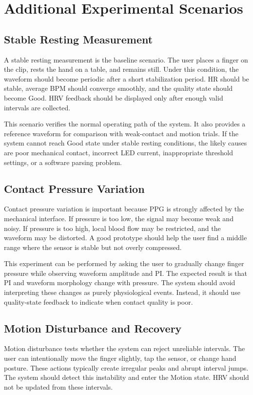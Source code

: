 \documentclass[10pt,conference]{IEEEtran}
\begin{document}
\section{Additional Experimental Scenarios}
\subsection{Stable Resting Measurement}
A stable resting measurement is the baseline scenario. The user places a finger on the clip, rests the hand on a table, and remains still. Under this condition, the waveform should become periodic after a short stabilization period. HR should be stable, average BPM should converge smoothly, and the quality state should become Good. HRV feedback should be displayed only after enough valid intervals are collected.

This scenario verifies the normal operating path of the system. It also provides a reference waveform for comparison with weak-contact and motion trials. If the system cannot reach Good state under stable resting conditions, the likely causes are poor mechanical contact, incorrect LED current, inappropriate threshold settings, or a software parsing problem.

\subsection{Contact Pressure Variation}
Contact pressure variation is important because PPG is strongly affected by the mechanical interface. If pressure is too low, the signal may become weak and noisy. If pressure is too high, local blood flow may be restricted, and the waveform may be distorted. A good prototype should help the user find a middle range where the sensor is stable but not overly compressed.

This experiment can be performed by asking the user to gradually change finger pressure while observing waveform amplitude and PI. The expected result is that PI and waveform morphology change with pressure. The system should avoid interpreting these changes as purely physiological events. Instead, it should use quality-state feedback to indicate when contact quality is poor.

\subsection{Motion Disturbance and Recovery}
Motion disturbance tests whether the system can reject unreliable intervals. The user can intentionally move the finger slightly, tap the sensor, or change hand posture. These actions typically create irregular peaks and abrupt interval jumps. The system should detect this instability and enter the Motion state. HRV should not be updated from these intervals.
\end{document}
